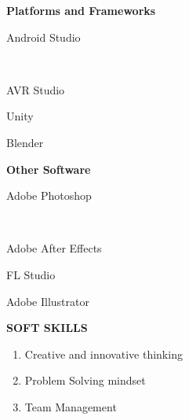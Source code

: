 \documentclass[10pt]{article}
\begin{document}
\begin{minipage}{0.95\textwidth}
\begin{multicols}{2}
\begin{enumerate}
\end{enumerate}



\Large\textbf{{Platforms and Frameworks}}\\
\begin{enumerate}
\normalsize {\item Android Studio}\\
\item AVR Studio\\
\item Unity\\
\item Blender\\

\end{enumerate}

\Large\textbf{{Other Software}}\\
\begin{enumerate}
\normalsize {\item {Adobe Photoshop}}\\
\item Adobe After Effects\\
\item FL Studio\\
\item Adobe Illustrator\\


\end{enumerate}



\end{multicols}

\vspace{5mm}

\end{minipage}


\begin{minipage}{0.95\textwidth}
\vspace{5mm}
\begin{huge}
\textbf{\color{theme}SOFT SKILLS}
\end{huge}
\begin{mdframed}[backgroundcolor=theme]
\end{mdframed}

\vspace{1mm}

\color{black}\normalsize{{
\begin{enumerate}
\item Creative and innovative thinking\\
\item Problem Solving mindset\\
\item Team Management\\


\end{enumerate}
}}
\vspace{2mm}
\end{minipage}
\end{document}
